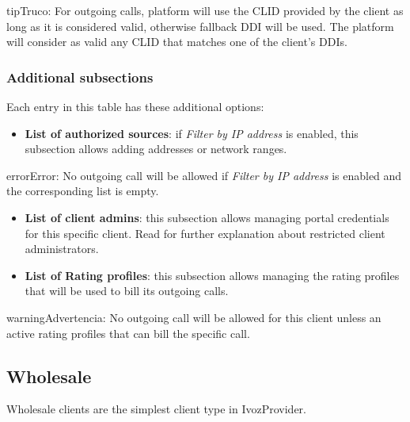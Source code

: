 \documentclass[letterpaper,10pt,spanish]{sphinxmanual}
\begin{document}
\begin{notice}{tip}{Truco:}
For outgoing calls, platform will use the CLID provided by the client as long as it is considered valid, otherwise fallback DDI
will be used. The platform will consider as valid any CLID that matches one of the client's DDIs.
\end{notice}


\subsubsection{Additional subsections}
\label{administration_portal/brand/clients/retail:additional-subsections}
Each entry in this table has these additional options:
\begin{itemize}
\item {} 
\textbf{List of authorized sources}: if \emph{Filter by IP address} is enabled, this subsection allows adding addresses or network ranges.

\end{itemize}

\begin{notice}{error}{Error:}
No outgoing call will be allowed if \emph{Filter by IP address} is enabled and the corresponding list is empty.
\end{notice}
\begin{itemize}
\item {} 
\textbf{List of client admins}: this subsection allows managing portal credentials for this specific client. Read {\hyperref[api_rest/acls:acls]{}}
for further explanation about restricted client administrators.

\item {} 
\textbf{List of Rating profiles}: this subsection allows managing the rating profiles that will be used to bill its outgoing calls.

\end{itemize}

\begin{notice}{warning}{Advertencia:}
No outgoing call will be allowed for this client unless an active rating profiles that can
bill the specific call.
\end{notice}


\subsection{Wholesale}
\label{administration_portal/brand/clients/wholesale:wholesale}\label{administration_portal/brand/clients/wholesale:wholesale-clients}\label{administration_portal/brand/clients/wholesale::doc}
Wholesale clients are the simplest client type in IvozProvider.
\end{document}
